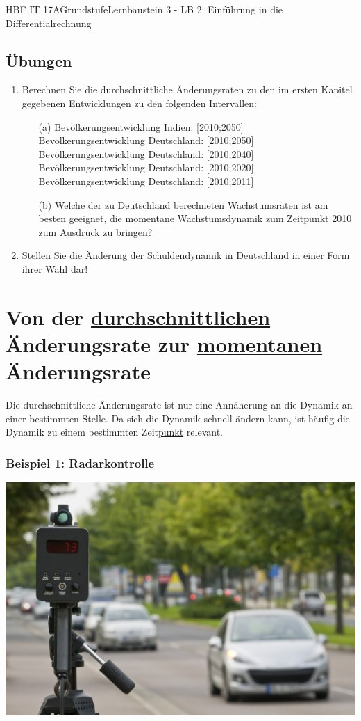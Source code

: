 \documentclass[11pt,twocolumn,oneside,openany,headings=optiontotoc,11pt,numbers=noenddot]{article}
\begin{document}
\begin{worksheet}{HBF IT 17A}{Grundstufe}{Lernbaustein 3 - LB 2: Einführung in die Differentialrechnung}
		\subsection{Übungen}
		\begin{enumerate}
			\item Berechnen Sie die durchschnittliche Änderungsraten zu den im ersten Kapitel gegebenen Entwicklungen zu den folgenden Intervallen:
			\begin{itemize}
				\item[(a)] Bevölkerungsentwicklung Indien: [2010;2050]\\
				Bevölkerungsentwicklung Deutschland: [2010;2050]\\
				Bevölkerungsentwicklung Deutschland: [2010;2040]\\
				Bevölkerungsentwicklung Deutschland: [2010;2020]\\
				Bevölkerungsentwicklung Deutschland: [2010;2011]\\
				\item[(b)] Welche der zu Deutschland berechneten Wachstumsraten ist am besten geeignet, die \underline{momentane} Wachstumsdynamik zum Zeitpunkt 2010 zum Ausdruck zu bringen?
			\end{itemize}
			\item Stellen Sie die Änderung der Schuldendynamik in Deutschland in einer Form ihrer Wahl dar!
		\end{enumerate}
		\section{Von der \underline{durchschnittlichen} Änderungsrate zur \underline{momentanen} Änderungsrate}
		Die durchschnittliche Änderungsrate ist nur eine Annäherung an die Dynamik an einer bestimmten Stelle. Da sich die Dynamik schnell ändern kann, ist häufig die Dynamik zu einem bestimmten Zeit\underline{punkt} relevant.
		\subsubsection*{Beispiel 1: Radarkontrolle}
		\includegraphics[scale=0.6]{Bilder/radar.jpg}

\end{worksheet}
\end{document}

